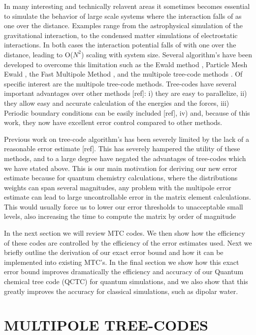 \documentclass[prb,aps,nobibnotes,superbib,preprint]{revtex4}
\begin{document}
In many interesting and technically relavent areas it sometimes becomes essential to simulate 
the behavior of large scale systems where the interaction 
falls of as one over the distance. Examples range from  the astrophysical simulation
of the gravitational interaction, to the condensed matter simulations of electrostatic interactions. 
In both cases the interaction potential falls of with one over the distance, 
leading to  {\cal O}($N^2$) scaling with system size. Several algorithm's have been developed to
overcome this limitation such as the Ewald method \cite{DFincham94}, 
Particle Mesh Ewald \cite{luty:94}, 
the Fast Multipole Method \cite{Singh93,shimada:94,singer:95a},
and the multipole tree-code methods \cite{JSalmon94}. 
Of specific interest are the multipole tree-code methods. 
Tree-codes have several important advantages over other methods [ref]: i) they are easy to parallelize,
ii) they allow easy and accurate calculation of the energies and the forces, iii) Periodic boundary
conditions can be easily included [ref], iv) and, because of this work, they
now have excellent error control compared to other methods.

Previous work on tree-code algorithm's has been severely limited by the lack of
a reasonable error estimate [ref]. 
This has severely hampered the utility of these methods, and to a large degree have negated the advantages
of tree-codes which we have stated above.
This is our main motivation for deriving our new error estimate because for quantum chemistry calculations, 
where the distributions weights can span several magnitudes, any problem with the multipole error 
estimate can  
lead to large uncontrollable error in the matrix element calculations. 
This would usually force us to lower our error 
thresholds to unacceptable small levels, also increasing the time to compute the matrix by order of
magnitude 

In the next section we will review MTC codes. We then show how the efficiency of these codes are
controlled by the efficiency of the error estimates used. Next we briefly outline the derivation of 
our exact error bound and how it can be implemented into existing MTC's. In the final
section we show how this exact error bound improves dramatically the efficiency and accuracy
of our Quantum chemical tree code (QCTC) for quantum simulations, and we also show that this
greatly improves the accuracy for classical simulations, such as dipolar water.


\section{MULTIPOLE TREE-CODES}
\end{document}

